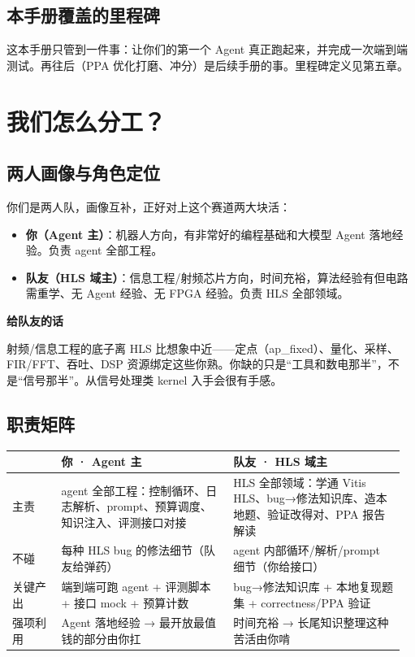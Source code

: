 \documentclass[12pt,a4paper]{ctexbook}
\begin{document}
\section{本手册覆盖的里程碑}

这本手册只管到一件事：让你们的第一个 Agent 真正跑起来，并完成一次端到端测试。再往后（PPA 优化打磨、冲分）是后续手册的事。里程碑定义见第五章。

\chapter{我们怎么分工？}

\section{两人画像与角色定位}

你们是两人队，画像互补，正好对上这个赛道两大块活：

\begin{itemize}
\item \textbf{你（Agent 主）}：机器人方向，有非常好的编程基础和大模型 Agent 落地经验。负责 agent 全部工程。
\item \textbf{队友（HLS 域主）}：信息工程/射频芯片方向，时间充裕，算法经验有但电路需重学、无 Agent 经验、无 FPGA 经验。负责 HLS 全部领域。
\end{itemize}

\begin{tipbox}
\textbf{给队友的话}\par
射频/信息工程的底子离 HLS 比想象中近——定点（ap\_fixed）、量化、采样、FIR/FFT、吞吐、DSP 资源绑定这些你熟。你缺的只是“工具和数电那半”，不是“信号那半”。从信号处理类 kernel 入手会很有手感。
\end{tipbox}

\section{职责矩阵}

\begin{longtable}{@{}p{0.12\linewidth}p{0.42\linewidth}p{0.42\linewidth}@{}}
\toprule
& \textbf{你 · Agent 主} & \textbf{队友 · HLS 域主} \\
\midrule
\endhead
主责 & agent 全部工程：控制循环、日志解析、prompt、预算调度、知识注入、评测接口对接 & HLS 全部领域：学通 Vitis HLS、bug→修法知识库、造本地题、验证改得对、PPA 报告解读 \\
不碰 & 每种 HLS bug 的修法细节（队友给弹药） & agent 内部循环/解析/prompt 细节（你给接口） \\
关键产出 & 端到端可跑 agent + 评测脚本 + 接口 mock + 预算计数 & bug→修法知识库 + 本地复现题集 + correctness/PPA 验证 \\
强项利用 & Agent 落地经验 → 最开放最值钱的部分由你扛 & 时间充裕 → 长尾知识整理这种苦活由你啃 \\
\bottomrule
\end{longtable}
\end{document}
